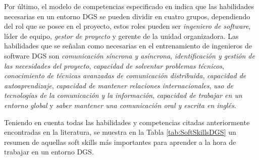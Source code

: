 Por último, el modelo de competencias especificado en \cite{saldana2014skills} indica que las habilidades necesarias en un entorno DGS se pueden dividir en cuatro grupos, dependiendo del rol que se posee en el proyecto, estos roles pueden ser \emph{ingeniero de software}, líder de equipo, \emph{gestor de proyecto} y gerente de la unidad organizadora. Las habilidades que se señalan como necesarias en el entrenamiento de ingenieros de software DGS son \emph{comunicación síncrona y asíncrona}, \emph{identificación  y gestión de las necesidades del proyecto}, \emph{capacidad de solventar problemas técnicos}, \emph{conocimiento de técnicas avanzadas de comunicación distribuida}, \emph{capacidad de autoaprendizaje}, \emph{capacidad de mantener relaciones internacionales}, \emph{uso de tecnologías de la comunicación y la información}, \emph{capacidad de trabajar en un entorno global} y \emph{saber mantener una comunicación oral y escrita en inglés}.

Teniendo en cuenta todas las habilidades y competencias citadas anteriormente encontradas en la literatura, se muestra en la Tabla \ref{tab:SoftSkillsDGS} un resumen de aquellas soft skills más importantes para aprender a la hora de trabajar en un entorno DGS.


